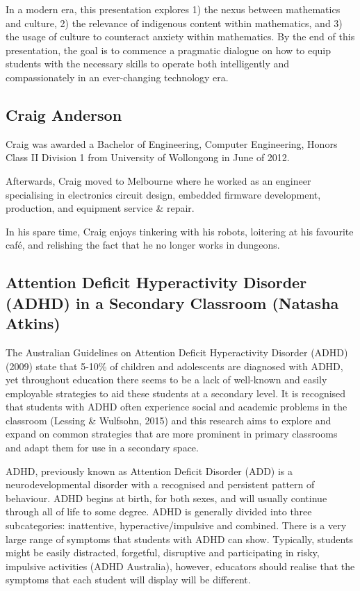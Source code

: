 \documentclass[twoside,14pt,a4paper,notitlepage]{memoir}
\begin{document}
In a modern era, this presentation explores 1) the nexus between mathematics and culture, 2) the relevance of indigenous content within mathematics, and 3) the usage of culture to counteract anxiety within mathematics. By the end of this presentation, the goal is to commence a pragmatic dialogue on how to equip students with the necessary skills to operate both intelligently and compassionately in an ever-changing technology era.

\subsection*{Craig Anderson}

Craig was awarded a Bachelor of Engineering, Computer Engineering, Honors Class II Division 1 from University of Wollongong in June of 2012.

Afterwards, Craig moved to Melbourne where he worked as an engineer specialising in electronics circuit design, embedded firmware development, production, and equipment service \& repair.

In his spare time, Craig enjoys tinkering with his robots, loitering at his favourite café, and relishing the fact that he no longer works in dungeons.




\subsection*{Attention Deficit Hyperactivity Disorder (ADHD) in a Secondary Classroom (Natasha Atkins)}

The Australian Guidelines on Attention Deficit Hyperactivity Disorder (ADHD) (2009) state that 5-10\% of children and adolescents are diagnosed with ADHD, yet throughout education there seems to be a lack of well-known and easily employable strategies to aid these students at a secondary level. It is recognised that students with ADHD often experience social and academic problems in the classroom (Lessing \& Wulfsohn, 2015) and this research aims to explore and expand on common strategies that are more prominent in primary classrooms and adapt them for use in a secondary space.

ADHD, previously known as Attention Deficit Disorder (ADD) is a neurodevelopmental disorder with a recognised and persistent pattern of behaviour. ADHD begins at birth, for both sexes, and will usually continue through all of life to some degree. ADHD is generally divided into three subcategories: inattentive, hyperactive/impulsive and combined. There is a very large range of symptoms that students with ADHD can show. Typically, students might be easily distracted, forgetful, disruptive and participating in risky, impulsive activities (ADHD Australia), however, educators should realise that the symptoms that each student will display will be different.
\end{document}
